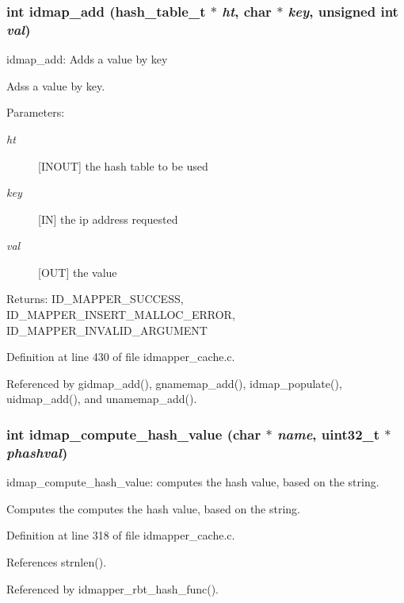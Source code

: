 \subsubsection{\setlength{\rightskip}{0pt plus 5cm}int idmap\_\-add (hash\_\-table\_\-t $\ast$ {\em ht}, char $\ast$ {\em key}, unsigned int {\em val})}\label{idmapper__cache_8c_a19}


idmap\_\-add: Adds a value by key

Adss a value by key.

\begin{Desc}
\item[Parameters:]
\begin{description}
\item[{\em ht}][INOUT] the hash table to be used \item[{\em key}][IN] the ip address requested \item[{\em val}][OUT] the value\end{description}
\end{Desc}
\begin{Desc}
\item[Returns:]ID\_\-MAPPER\_\-SUCCESS, ID\_\-MAPPER\_\-INSERT\_\-MALLOC\_\-ERROR, ID\_\-MAPPER\_\-INVALID\_\-ARGUMENT \end{Desc}


Definition at line 430 of file idmapper\_\-cache.c.

Referenced by gidmap\_\-add(), gnamemap\_\-add(), idmap\_\-populate(), uidmap\_\-add(), and unamemap\_\-add().
\subsubsection{\setlength{\rightskip}{0pt plus 5cm}int idmap\_\-compute\_\-hash\_\-value (char $\ast$ {\em name}, uint32\_\-t $\ast$ {\em phashval})}\label{idmapper__cache_8c_a18}


idmap\_\-compute\_\-hash\_\-value: computes the hash value, based on the string.

Computes the computes the hash value, based on the string. 

Definition at line 318 of file idmapper\_\-cache.c.

References strnlen().

Referenced by idmapper\_\-rbt\_\-hash\_\-func().
